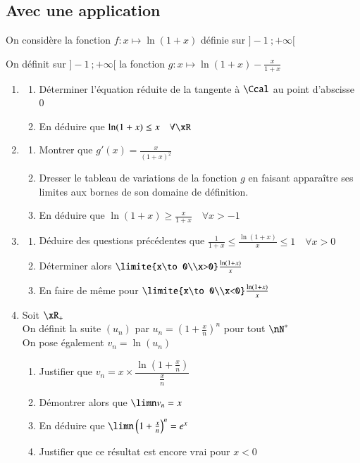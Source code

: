 \documentclass[oneside,12pt]{article}          %
\begin{document}
\subsection{Avec une application}
On considère la fonction $f:x\mapsto \ln(1+x)$ définie sur $]-1~;+\infty[$

On définit sur $]-1~;+\infty[$ la fonction $g:x\mapsto \ln(1+x)-\frac{x}{1+x}$
\begin{enumerate}
	\item \begin{enumerate}
		\item Déterminer l'équation réduite de la tangente à $\Ccal$ au point d'abscisse $0$
		\item En déduire que $\ln(1+x)\leq x \quad \forall\xR$
	\end{enumerate}
	\item \begin{enumerate}
		\item Montrer que $g'(x)=\frac{x}{(1+x)^2}$
		\item Dresser le tableau de variations de la fonction $g$ en faisant apparaître ses limites aux bornes de son domaine de définition.
		\item En déduire que $\ln(1+x)\geq\frac{x}{1+x} \quad \forall x>-1$
	\end{enumerate}
	\item \begin{enumerate}
		\item Déduire des questions précédentes que $\frac{1}{1+x} \leq \frac{\ln(1+x)}{x}\leq 1 \quad \forall x>0$
		\item Déterminer alors $\limite{x\to0\\x>0}\frac{\ln(1+x)}{x}$
		\item En faire de même pour $\limite{x\to0\\x<0}\frac{\ln(1+x)}{x}$
	\end{enumerate}
	\item Soit $\xR_+$\\
	On définit la suite $(u_n)$ par $u_n=\left(1+\frac{x}{n}\right)^n$ pour tout $\nN^*$ \\
	On pose également $v_n=\ln(u_n)$
	\begin{enumerate}
		\item Justifier que $v_n=x\times\dfrac{\ln\left(1+\frac{x}{n}\right)}{\frac{x}{n}}$
		\item Démontrer alors que $\limn v_n =x$
		\item En déduire que $\limn \left(1+\frac{x}{n}\right)^n =e^x$
		\item[($\star$)] Justifier que ce résultat est encore vrai pour $x<0$
	\end{enumerate}
\end{enumerate}
\end{document}
